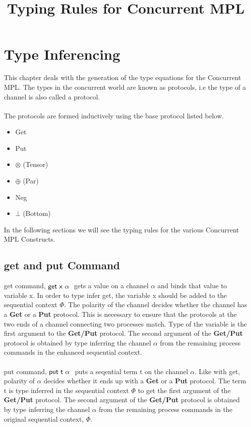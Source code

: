 \documentclass[11pt]{article}
\title{Typing Rules for Concurrent MPL}
\newcommand{\get}{\ensuremath{{\sf get ~ x ~\alpha~}}\xspace}
\newcommand{\putC}{\ensuremath{{\sf put ~ t ~\alpha~}}\xspace}
\begin{document}
\maketitle

\section{Type Inferencing}
This chapter deals with the generation of the type equations for the Concurrent MPL. The types in the concurrent world are known as protocols, i.e the type of a channel is also called a protocol.
~~\\~~\\
The protocols are formed inductively using the base protocol listed below.
\begin {itemize}
  \item Get
  \item Put
  \item $\otimes$ (Tensor)
  \item $\oplus$ (Par)
  \item Neg
  \item $\bot$ (Bottom)
\end   {itemize} 
 
In the following sections we will see the typing rules for the various Concurrent MPL Constructs.



\subsection {get and put Command}
 {\sf get} command, $\get$ gets a value on a channel $\alpha$ and binds that value to variable x.
In order to type infer {\sf get}, the variable x should be added to the sequential context $\Phi$. The polarity of the channel decides whether the channel has a {\bf Get} or a {\bf Put} protocol. This is necessary to ensure that the protocols at the two ends of a channel connecting two processes match. Type of the variable is the first argument to the {\bf Get/Put} protocol. The second argument of the {\bf Get/Put} protocol is obtained by type inferring the channel $\alpha$ from the remaining process commands in the enhanced sequential context. 
~~\\~~\\
{\sf put} command, $\putC$ puts a seqential term t on the channel $\alpha$. Like with {\sf get}, polarity of $\alpha $ decides whether it ends up with a {\bf Get} or a {\bf Put} protocol. The term t is type inferred in the sequential context $\Phi$ to get the first argument of the {\bf Get/Put} protocol. The second argument of the {\bf Get/Put} protocol is obtained by type inferring the channel $\alpha$ from the remaining process commands in the original sequential context, $\Phi$.  
\end{document}
